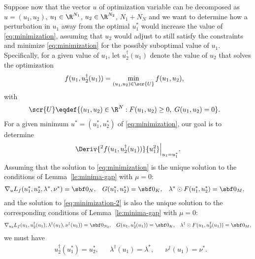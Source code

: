 \documentclass[11pt]{article}
\begin{document}
Suppose now that the vector $u$ of optimization variable can be
decomposed as $u=(u_1,u_2)$, $u_1\in\R^{N_1}$, $u_2\in\R^{N_2}$,
$N_1+N_N$ and we want to determine how a perturbation in $u_1$ away
from the optimal $u_1^*$ would increase the value of
\eqref{eq:minimization}, assuming that $u_2$ would adjust to still
satisfy the constraints and minimize \eqref{eq:minimization} for the
possibly suboptimal value of $u_1$.
%
Specifically, for a given value of $u_1$, let $u_2^\dagger(u_1)$ denote
the value of $u_2$ that solves the optimization
\begin{align}\label{eq:minimization-2}
  f(u_1,u_2^\dagger(u_1))&=\min_{(u_1,u_2)\in\scr{U}} f(u_1,u_2), &
\end{align}
with
\begin{align*}
  \scr{U}&\eqdef\{(u_1,u_2)\in\R^{N}: F(u_1,u_2)\ge 0,\; G(u_1,u_2)=0\}.
\end{align*}
For a given minimum $u^*=(u_1^*,u_2^*)$ of \eqref{eq:minimization}, our
goal is to determine
\begin{align*}
  \Deriv{^2f(u_1,u_2^\dagger(u_1))}{u_1^2}\Big|_{u_1=u_1^*}.
\end{align*}
Assuming that the solution to \eqref{eq:minimization} is the unique
solution to the conditions of Lemma~\ref{le:minima-gap} with $\mu=0$:
\begin{align}\label{eq:u-star}
  &\nabla_u L_f(u_1^*,u_2^*,\lambda^*,\nu^*)=\sbf 0_{N}, &
  &G(u_1^*,u_2^*)=\sbf 0 _{K}, &
  &\lambda^*\odot F(u_1^*,u_2^*)=\sbf 0_{M}, &
\end{align}
and the solution to \eqref{eq:minimization-2} is also the unique
solution to the corresponding conditions of Lemma~\ref{le:minima-gap}
with $\mu=0$:
  \begin{align}\label{eq:u-dagger}
  &\nabla_{u_2} L_f(u_1,u_2^\dagger(u_1),\lambda^\dagger(u_1),\nu^\dagger(u_1))=\sbf 0_{N_2}, &
  &G(u_1,u_2^\dagger(u_1))=\sbf 0 _{K}, 
  &\lambda^\dagger\odot F(u_1,u_2^\dagger(u_1))=\sbf 0_{M}, 
\end{align}
we must have
\begin{align*}
  &u_2^\dagger(u_1^*)=u_2^*, &
  &\lambda^\dagger(u_1)=\lambda^*, &
  &\nu^\dagger(u_1)=\nu^*.
\end{align*}
\end{document}
